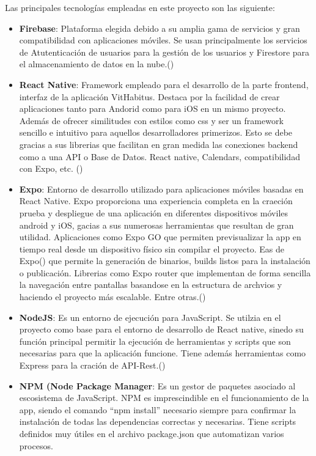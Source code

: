 Las principales tecnologías empleadas en este proyecto son las siguiente:
\begin{itemize}
    \item \textbf{Firebase}: Plataforma elegida debido a su amplia gama de servicios y gran compatibilidad con aplicaciones móviles. Se usan principalmente los servicios de Atutenticación de usuarios para la gestión de los usuarios y Firestore para el almacenamiento de datos en la nube.(\cite{firebase_docs}) 
    \item \textbf{React Native}: Framework empleado para el desarrollo de la parte frontend, interfaz de la aplicación VitHabitus. Destaca por la facilidad de crear aplicaciones tanto para Andorid como para iOS en un mismo proyecto. Además de ofrecer similitudes con estilos como css y ser un framework sencillo e intuitivo para aquellos desarrolladores primerizos. Esto se debe gracias a sus librerias que facilitan en gran medida las conexiones backend como a una API o Base de Datos. React native, Calendars, compatibilidad con Expo, etc. (\cite{react_native})
    \item \textbf{Expo}: Entorno de desarrollo utilizado para aplicaciones móviles basadas en React Native. Expo proporciona una experiencia completa en la craeción prueba y despliegue de una aplicación en diferentes dispositivos móviles android y iOS, gacias a sus numerosas herramientas que resultan de gran utilidad. 
    Aplicaciones como Expo GO que permiten previsualizar la app en tiempo real desde un dispositivo físico sin compilar el proyecto. Eas de Expo(\cite{eas}) que permite la generación de binarios, builds listos para la instalación o publicación. Librerias como Expo router que implementan de forma sencilla la navegación entre pantallas basandose en la estructura de archvios y haciendo el proyecto más escalable. Entre otras.(\cite{expo_docs})
    \item \textbf{NodeJS}: Es un entorno de ejecución para JavaScript. Se utilzia en el proyecto como base para el entorno de desarrollo de React native, sinedo su función principal permitir la ejecución de herramientas y scripts que son necesarias para que la aplicación funcione. Tiene además herramientas como Express para la cración de API-Rest.(\cite{nodejs})
    \item \textbf{NPM (Node Package Manager}: Es un gestor de paquetes asociado al escosistema de JavaScript. NPM es imprescindible en el funcionamiento de la app, siendo el comando ``npm install'' necesario siempre para confirmar la instalación de todas las dependencias correctas y necesarias. Tiene scripts definidos muy útiles en el archivo package.json que automatizan varios procesos.

\end{itemize}
